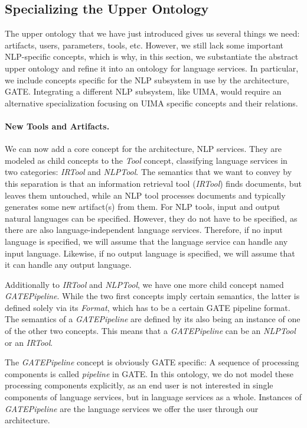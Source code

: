 \subsection{Specializing the Upper Ontology}
\label{sec:lsont}
The upper ontology that we have just introduced gives us several
things we need: artifacts, users, parameters, tools, etc. However, we
still lack some important NLP-specific concepts, which is why, in this
section, we substantiate the abstract upper ontology and refine it
into an ontology for language services. In particular, we include
concepts specific for the NLP subsystem in use by the \sa
architecture, GATE. Integrating a different NLP subsystem, like UIMA,
would require an alternative specialization focusing on UIMA specific
concepts and their relations.

\paragraph{New Tools and Artifacts.} We can now add a core concept for
the \sa architecture, NLP services. They are modeled as child concepts
to the \emph{Tool} concept, classifying language services in two
categories: \emph{IRTool} and \emph{NLPTool}. The semantics that we
want to convey by this separation is that an information retrieval
tool (\emph{IRTool}) finds documents, but leaves them untouched, while
an NLP tool processes documents and typically generates some new
artifact(s) from them. For NLP tools, input and output natural
languages can be specified. However, they do not have to be specified,
as there are also language-independent language services. Therefore,
if no input language is specified, we will assume that the language
service can handle any input language. Likewise, if no output language
is specified, we will assume that it can handle any output language.

Additionally to \emph{IRTool} and \emph{NLPTool}, we have one more
child concept named \emph{GATEPipeline}. While the two first concepts
imply certain semantics, the latter is defined solely via its
\emph{Format}, which has to be a certain GATE pipeline format. The
semantics of a \emph{GATEPipeline} are defined by its also being an
instance of one of the other two concepts. This means that a
\emph{GATEPipeline} can be an \emph{NLPTool} or an \emph{IRTool}.

The \emph{GATEPipeline} concept is obviously GATE specific: A sequence
of processing components is called \emph{pipeline} in GATE. In this
ontology, we do not model these processing components explicitly, as
an end user is not interested in single components of language services,
but in language services as a whole. Instances of \emph{GATEPipeline}
are the language services we offer the user through our architecture.

